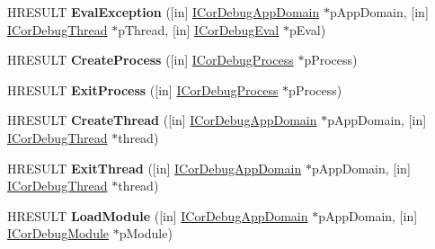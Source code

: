 \begin{DoxyCompactItemize}
\item 
\mbox{\label{interface_i_cor_debug_managed_callback_a49fa3b5126492a82b27f0e139dc6bc3d}} 
H\+R\+E\+S\+U\+LT {\bfseries Eval\+Exception} (\mbox{[}in\mbox{]} \hyperlink{interface_i_cor_debug_app_domain}{I\+Cor\+Debug\+App\+Domain} $\ast$p\+App\+Domain, \mbox{[}in\mbox{]} \hyperlink{interface_i_cor_debug_thread}{I\+Cor\+Debug\+Thread} $\ast$p\+Thread, \mbox{[}in\mbox{]} \hyperlink{interface_i_cor_debug_eval}{I\+Cor\+Debug\+Eval} $\ast$p\+Eval)
\item 
\mbox{\label{interface_i_cor_debug_managed_callback_a500b192b6096065982bad4cda4797e52}} 
H\+R\+E\+S\+U\+LT {\bfseries Create\+Process} (\mbox{[}in\mbox{]} \hyperlink{interface_i_cor_debug_process}{I\+Cor\+Debug\+Process} $\ast$p\+Process)
\item 
\mbox{\label{interface_i_cor_debug_managed_callback_a7377754373fabe4871c913f947c582f3}} 
H\+R\+E\+S\+U\+LT {\bfseries Exit\+Process} (\mbox{[}in\mbox{]} \hyperlink{interface_i_cor_debug_process}{I\+Cor\+Debug\+Process} $\ast$p\+Process)
\item 
\mbox{\label{interface_i_cor_debug_managed_callback_a7b5ecc680462934e1f4adf49c6112a6d}} 
H\+R\+E\+S\+U\+LT {\bfseries Create\+Thread} (\mbox{[}in\mbox{]} \hyperlink{interface_i_cor_debug_app_domain}{I\+Cor\+Debug\+App\+Domain} $\ast$p\+App\+Domain, \mbox{[}in\mbox{]} \hyperlink{interface_i_cor_debug_thread}{I\+Cor\+Debug\+Thread} $\ast$thread)
\item 
\mbox{\label{interface_i_cor_debug_managed_callback_a3271413880acd40d14fbcf31d27abfbb}} 
H\+R\+E\+S\+U\+LT {\bfseries Exit\+Thread} (\mbox{[}in\mbox{]} \hyperlink{interface_i_cor_debug_app_domain}{I\+Cor\+Debug\+App\+Domain} $\ast$p\+App\+Domain, \mbox{[}in\mbox{]} \hyperlink{interface_i_cor_debug_thread}{I\+Cor\+Debug\+Thread} $\ast$thread)
\item 
\mbox{\label{interface_i_cor_debug_managed_callback_af5952e6d7201d059fe3a5dc1f2614680}} 
H\+R\+E\+S\+U\+LT {\bfseries Load\+Module} (\mbox{[}in\mbox{]} \hyperlink{interface_i_cor_debug_app_domain}{I\+Cor\+Debug\+App\+Domain} $\ast$p\+App\+Domain, \mbox{[}in\mbox{]} \hyperlink{interface_i_cor_debug_module}{I\+Cor\+Debug\+Module} $\ast$p\+Module)

\end{DoxyCompactItemize}
